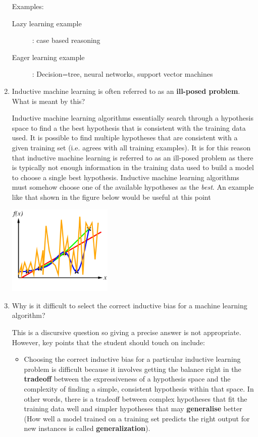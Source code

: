 \documentclass[--SOLUTION-OPTION--]{ditpaper}
\begin{document}
\begin{enumerate}
\begin{answer}
			Examples:
			\begin{description}
				\item [Lazy learning example]: case based reasoning
				\item [Eager learning example]: Decision=tree, neural networks, support vector machines
			\end{description}
		\end{answer}
	\item  Inductive machine learning is often referred to as an \textbf{ill-posed problem}. What is meant by this?
	\begin{answer}
		Inductive machine learning algorithms essentially search through a hypothesis space to find a the best hypothesis that is consistent with the training data used. It is possible to find multiple hypotheses that are  consistent with a given training set (i.e. agrees with all training examples).  It is for this reason that inductive machine learning is referred to as an ill-posed problem as there is typically not enough information in the training data used to build a model to choose a single best hypothesis. Inductive machine learning algorithms must somehow choose one of the available hypotheses as the \emph{best}. An example like that shown in the figure below would be useful at this point
		\begin{center}
			\includegraphics[width=5cm]{./images/curve-fitting5.png}
		\end{center}
	\end{answer}
\item Why is it difficult to select the correct inductive bias for a machine learning algorithm?
\begin{answer}
This is a discursive question so giving a precise answer is not appropriate. However, key points that the student should touch on include:
		\begin{itemize}
			\item Choosing the correct inductive bias for a particular inductive learning problem is difficult because it involves getting the balance right in the \textbf{tradeoff} between the expressiveness of a hypothesis space and the complexity of finding a simple, consistent hypothesis within that space. In other words, there is a tradeoff between complex hypotheses that fit the training data well and simpler hypotheses that may \textbf{generalise} better (How well a model trained on a training set predicts the right output for new instances is called \textbf{generalization}).

\end{itemize}
\end{answer}
\end{enumerate}
\end{document}
